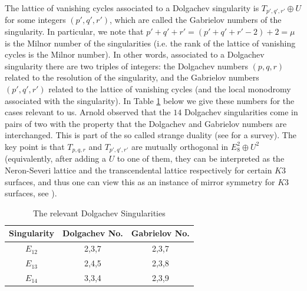 \documentclass[11pt]{amsart}
\numberwithin{equation}{section}
\theoremstyle{plain}
\theoremstyle{remark}
\theoremstyle{definition}
\begin{document}
The lattice of vanishing cycles associated to a Dolgachev singularity is $T_{p',q',r'}\oplus U$ for some integers $(p',q',r')$, which are called the Gabrielov numbers of the singularity. In particular, we note that $p'+q'+r'=(p'+q'+r'-2)+2=\mu$ is the Milnor number of the singularities (i.e. the rank of the lattice of vanishing cycles is the Milnor number). In other words, associated to a Dolgachev singularity there are two triples of integers: the Dolgachev numbers $(p,q,r)$ related to the resolution of the singularity, and the Gabrielov numbers  $(p',q',r')$ related to the lattice of vanishing cycles (and the local monodromy associated with the singularity). In Table \ref{table3} below we give these numbers for the cases relevant to us. 
Arnold observed that the $14$ Dolgachev singularities come in pairs of two with the property that the Dolgachev and Gabrielov numbers are interchanged. This is part of the so called strange duality (see \cite{ebeling} for a survey). The key point is that $T_{p,q,r}$ and $T_{p',q',r'}$ are mutually orthogonal in $E_8^2\oplus U^2$ (equivalently, after adding a $U$ to one of them, they can be interpreted as the Neron-Severi lattice and the transcendental lattice respectively for certain $K3$ surfaces, and thus one can view this as an instance of mirror symmetry for $K3$ surfaces, see \cite{dolgachevm}). 
 
\begin{table}[htb!]
\begin{tabular}{|c|c|c|}
\hline
Singularity& Dolgachev No. & Gabrielov No.\\
\hline
$E_{12}$& 2,3,7 & 2,3,7\\
$E_{13}$& 2,4,5 & 2,3,8\\
$E_{14}$& 3,3,4 & 2,3,9\\
\hline
\end{tabular}
\vspace{0.2cm}
\caption{The relevant Dolgachev Singularities}\label{table3}
\end{table}
\end{document}
